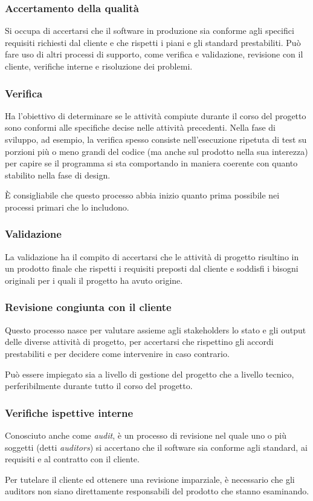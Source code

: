 \subsubsection{Accertamento della qualità}
Si occupa di accertarsi che il software in produzione sia conforme agli specifici requisiti richiesti dal cliente e che rispetti i piani e gli standard prestabiliti. Può fare uso di altri processi di supporto, come verifica e validazione, revisione con il cliente, verifiche interne e risoluzione dei problemi.
\subsubsection{Verifica}
Ha l'obiettivo di determinare se le attività compiute durante il corso del progetto sono conformi alle specifiche decise nelle attività precedenti. Nella fase di sviluppo, ad esempio, la verifica spesso consiste nell'esecuzione ripetuta di test su porzioni più o meno grandi del codice (ma anche sul prodotto nella sua interezza) per capire se il programma si sta comportando in maniera coerente con quanto stabilito nella fase di design.
\par È consigliabile che questo processo abbia inizio quanto prima possibile nei processi primari che lo includono.
\subsubsection{Validazione}
La validazione ha il compito di accertarsi che le attività di progetto risultino in un prodotto finale che rispetti i requisiti preposti dal cliente e soddisfi i bisogni originali per i quali il progetto ha avuto origine.
\subsubsection{Revisione congiunta con il cliente}
Questo processo nasce per valutare assieme agli stakeholders lo stato e gli output delle diverse attività di progetto, per accertarsi che rispettino gli accordi prestabiliti e per decidere come intervenire in caso contrario.
\par Può essere impiegato sia a livello di gestione del progetto che a livello tecnico, perferibilmente durante tutto il corso del progetto.
\subsubsection{Verifiche ispettive interne}
Conosciuto anche come \textit{audit}, è un processo di revisione nel quale uno o più soggetti (detti \textit{auditors}) si accertano che il software sia conforme agli standard, ai requisiti e al contratto con il cliente.
\par Per tutelare il cliente ed ottenere una revisione imparziale, è necessario che gli auditors non siano direttamente responsabili del prodotto che stanno esaminando.

